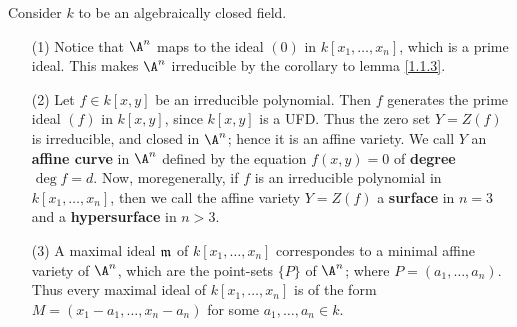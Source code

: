 \begin{example}\label{example_1.5}
    Consider $k$ to be an algebraically closed field.
    \begin{enumerate}
        \item[(1)] Notice that $\A^n$ maps to the ideal $(0)$ in $k[x_1, \dots,
            x_n]$, which is a prime ideal. This makes $\A^n$ irreducible by
            the corollary to lemma \ref{1.1.3}.

        \item[(2)] Let $f \in k[x,y]$ be an irreducible polynomial. Then $f$
            generates the prime ideal  $(f)$ in $k[x,y]$, since $k[x,y]$ is a
            UFD. Thus the zero set $Y=Z(f)$ is irreducible, and closed in
            $\A^n$; hence it is an affine variety. We call $Y$ an
            \textbf{affine curve} in $\A^n$ defined by the equation $f(x,y)=0$
            of \textbf{degree} $\deg{f}=d$. Now, moregenerally, if $f$ is an
            irreducible polynomial in $k[x_1, \dots, x_n]$, then we call the
            affine variety $Y=Z(f)$ a \textbf{surface} in $n=3$ and a
            \textbf{hypersurface} in $n>3$.

        \item[(3)] A maximal ideal $\mathfrak{m}$ of $k[x_1, \dots, x_n]$ correspondes to
            a minimal affine variety of $\A^n$, which are the point-sets $\{P\}$
            of $\A^n$; where  $P=(a_1, \dots, a_n)$. Thus every maximal ideal of
            $k[x_1, \dots, x_n]$ is of the form $M=(x_1-a_1, \dots,x_n-a_n)$ for
            some $a_1, \dots, a_n \in k$.


\end{enumerate}
\end{example}
